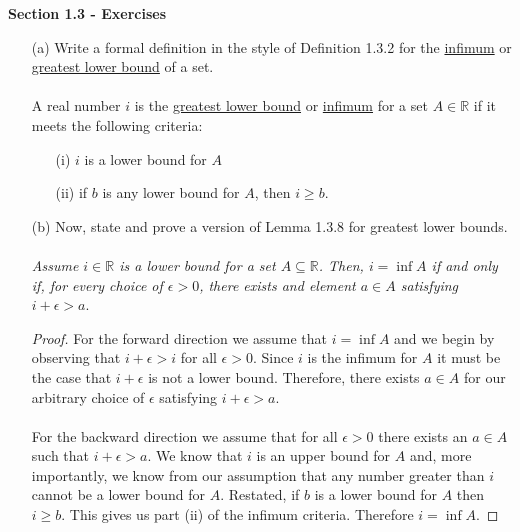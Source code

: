 \documentclass[11pt]{article}
\newcommand{\mytitlecompact}[1]{{

\hfill
{\Large \sffamily \bfseries{#1}}
\hfill
}}
\def\R{{\mathbb{R}}}
\newenvironment{exer}[1]
    {\renewcommand\theinnercustomexer{#1}\innercustomexer\upshape}
    {\endinnercustomexer}
\begin{document}
\mytitlecompact{Section 1.3 - Exercises}

\begin{exer}{1.3.1}
    \begin{enumerate}
        \item[(a)]
            Write a formal definition in the style of Definition 1.3.2 for the \underline{infimum} or \underline{greatest lower bound} of a set. \\ \\
            A real number $i$ is the \underline{greatest lower bound} or \underline{infimum} for a set $A\in\R$ if it meets the following criteria:
            \begin{enumerate}
                \item[(i)] $i$ is a lower bound for $A$
                \item[(ii)] if $b$ is any lower bound for $A$, then $i\geq b$.
            \end{enumerate}
        \item[(b)]
            Now, state and prove a version of Lemma 1.3.8 for greatest lower bounds. \\ \\
            \emph{Assume $i\in\R$ is a lower bound for a set $A\subseteq\R$. Then, $i=\inf A$ if and only if, for every choice of $\epsilon>0$, there exists and element $a\in A$ satisfying $i+\epsilon>a$}.
            \begin{proof}
                For the forward direction we assume that $i=\inf A$ and we begin by observing that $i+\epsilon>i$ for all $\epsilon>0$. Since $i$ is the infimum for $A$ it must be the case that $i+\epsilon$ is not a lower bound. Therefore, there exists $a\in A$ for our arbitrary choice of $\epsilon$ satisfying $i+\epsilon>a$. \\ \\
                For the backward direction we assume that for all $\epsilon>0$ there exists an $a\in A$ such that $i+\epsilon> a$. We know that $i$ is an upper bound for $A$ and, more importantly, we know from our assumption that any number greater than $i$ cannot be a lower bound for $A$. Restated, if $b$ is a lower bound for $A$ then $i\geq b$. This gives us part (ii) of the infimum criteria. Therefore $i=\inf A$.
            \end{proof}
    \end{enumerate}
\end{exer}
\end{document}
